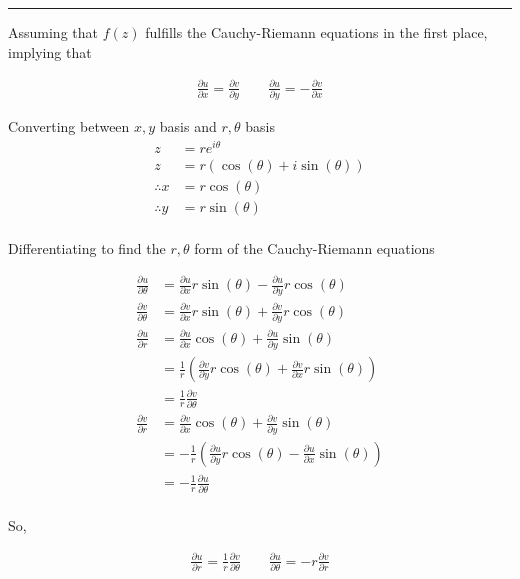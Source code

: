 \documentclass[12pt, oneside]{article}
\newenvironment{answer}
  {\vspace*{0.2cm} \rule{12cm}{0.02cm} \vspace*{0.2cm}}
  {\vspace*{0.2cm}}
\begin{document}
\begin{enumerate}
  \begin{answer}

    Assuming that $f(z)$ fulfills the Cauchy-Riemann equations in the first place, implying that

  \begin{align*}
      \frac{\partial u}{\partial x} = \frac{\partial v}{\partial y} \quad \quad
      \frac{\partial u}{\partial y} = -\frac{\partial v}{\partial x}
  \end{align*}

  Converting between $x,y$ basis and $r,\theta$ basis
  \begin{align*}
    z &= re^{i\theta}\\
    z &= r(\cos(\theta) + i\sin(\theta))\\
    \therefore x &= r\cos(\theta)\\
    \therefore y &= r\sin(\theta)\\
  \end{align*}

  Differentiating to find the $r,\theta$ form of the Cauchy-Riemann equations

  \begin{align*}
    \frac{\partial u}{\partial \theta} &= \frac{\partial u}{\partial x}r\sin(\theta) - \frac{\partial u}{\partial y}r\cos(\theta)\\
    \frac{\partial v}{\partial \theta} &= \frac{\partial v}{\partial x}r\sin(\theta) + \frac{\partial v}{\partial y}r\cos(\theta)\\
    \frac{\partial u}{\partial r} &= \frac{\partial u}{\partial x}\cos(\theta) +\frac{\partial u}{\partial y}\sin(\theta)\\
     &= \frac{1}{r}(\frac{\partial v}{\partial y}r\cos(\theta) +\frac{\partial v}{\partial x}r\sin(\theta))\\
     &= \frac{1}{r}\frac{\partial v}{\partial \theta}\\
     \frac{\partial v}{\partial r} &= \frac{\partial v}{\partial x}\cos(\theta) +\frac{\partial v}{\partial y}\sin(\theta)\\
      &= -\frac{1}{r}(\frac{\partial u}{\partial y}r\cos(\theta) -\frac{\partial u}{\partial x}\sin(\theta))\\
      &= -\frac{1}{r}\frac{\partial u}{\partial \theta}\\
  \end{align*}

  So,

  \begin{align*}
      \frac{\partial u}{\partial r} = \frac{1}{r}\frac{\partial v}{\partial \theta} \quad \quad
      \frac{\partial u}{\partial \theta} = -r\frac{\partial v}{\partial r}
  \end{align*}


\end{answer}
\end{enumerate}
\end{document}
